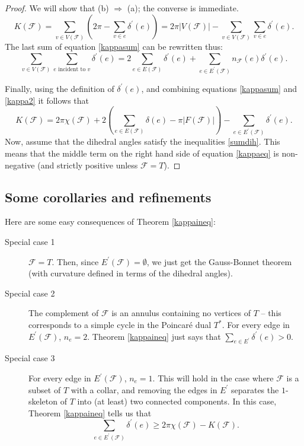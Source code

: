 \documentclass{acmart}
\newcommand{\thm}[2]{\begin{#1} #2 \end{#1}}
\begin{document}
\thm{proof}
{
We will show that (b) $\Rightarrow$ (a); the converse is immediate.
\begin{equation}
\label{kappasum}
K(\mathcal{F}) = \sum_{v\in V(\mathcal{F})} 
(2\pi - \sum_{\mbox{$v\in e$}} \delta^\prime(e))=
2\pi |V(\mathcal{F})| - \sum_{v\in V(\mathcal{F})}\sum_{\mbox{$v \in e$}}  
\delta^\prime(e).
\end{equation}
The last sum of equation \ref{kappasum} can  be rewritten thus:
\begin{equation}
\label{kappa2}
\sum_{v\in V(\mathcal{F})}\sum_{\mbox{$e$ incident to $v$}}
\delta^\prime(e) = 2 \sum_{e\in E(\mathcal{F})} \delta^\prime(e) +
\sum_{e\in E^\prime(\mathcal{F})}  n_{\mathcal{F}}(e) \delta^\prime
(e). 
\end{equation}

Finally, using the definition of $\delta^\prime(e)$, and combining equations
\ref{kappasum} and \ref{kappa2} it follows that
\begin{equation}
\label{kappaeq}
K(\mathcal{F}) = 2\pi \chi(\mathcal{F}) + 
2(\sum_{e\in E(\mathcal{F})} \delta(e) -\pi |F(\mathcal{F})|)
 - \sum_{e\in E^\prime(\mathcal{F})} \delta^\prime(e).
\end{equation}
Now, assume that the dihedral angles satisfy the inequalities \ref{sumdih}. This
means that the middle term on the right hand side of equation \ref{kappaeq} is
non-negative (and strictly positive unless $\mathcal{F} = T$).
}

\subsection{Some corollaries and refinements}
\label{corref}

Here are some easy consequences of Theorem \ref{kappaineq}:

\begin{description}

\item[Special case 1] $\mathcal{F} = T$. Then, since $E^\prime(\mathcal{F}) =
\emptyset$, 
we just get the Gauss-Bonnet theorem (with curvature defined in terms of the
dihedral angles).

\item[Special case 2]  The complement of $\mathcal{F}$ is an annulus
containing no vertices of $T$ -- this corresponds to a simple cycle in
the Poincar\'e dual $T^*$. For every edge in $E^\prime(\mathcal{F})$,
$n_e = 2$.   Theorem \ref{kappaineq} just says that $\sum_{e \in
E^\prime} \delta^\prime(e) > 0.$ 

\item[Special case 3] For every edge in $E^\prime(\mathcal{F})$, $n_e = 1$. This will
hold in the case where $\mathcal{F}$ is a subset of $T$ with a collar, and removing
the edges in $E^\prime$ separates the $1$-skeleton of $T$ into (at least) two 
connected components. In this case, Theorem \ref{kappaineq} tells us that
$$
\sum_{e\in E^\prime(\mathcal{F})} \delta^\prime(e)\geq 
2\pi \chi (\mathcal{F})- K(\mathcal{F}).
$$
\end{description}
\end{document}
